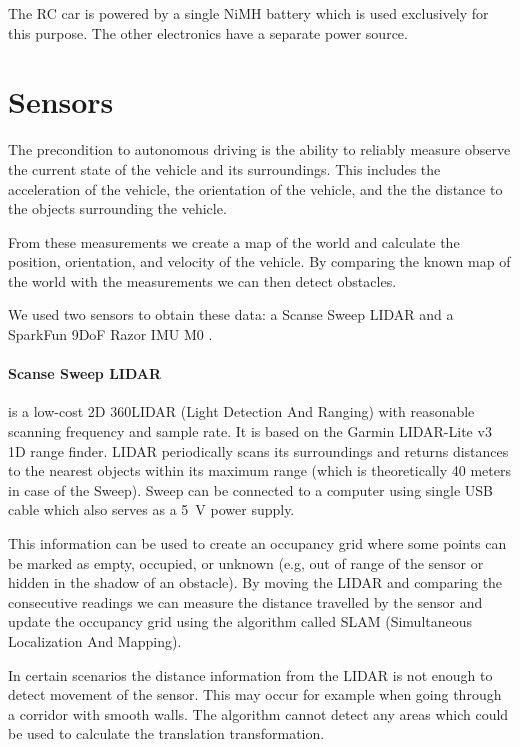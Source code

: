 The RC car is powered by a single NiMH battery which is used exclusively for this purpose. The other electronics have a separate power source.

\section{Sensors}

The precondition to autonomous driving is the ability to reliably measure observe the current state of the vehicle and its surroundings. This includes the acceleration of the vehicle, the orientation of the vehicle, and the the distance to the objects surrounding the vehicle.

From these measurements we create a map of the world and calculate the position, orientation, and velocity of the vehicle. By comparing the known map of the world with the measurements we can then detect obstacles.

We used two sensors to obtain these data: a Scanse Sweep LIDAR \cite{sweep} and a SparkFun 9DoF Razor IMU M0 \cite{imu}.

\paragraph{Scanse Sweep LIDAR} is a low-cost 2D 360\textdegree LIDAR (Light Detection And Ranging) with reasonable scanning frequency and sample rate. It is based on the Garmin LIDAR-Lite v3 \cite{lidar-lite} 1D range finder. LIDAR periodically scans its surroundings and returns distances to the nearest objects within its maximum range (which is theoretically 40 meters in case of the Sweep). Sweep can be connected to a computer using single USB cable which also serves as a \SI{5}{V} power supply.

This information can be used to create an occupancy grid where some points can be marked as empty, occupied, or unknown (e.g, out of range of the sensor or hidden in the shadow of an obstacle). By moving the LIDAR and comparing the consecutive readings we can measure the distance travelled by the sensor and update the occupancy grid using the algorithm called SLAM (Simultaneous Localization And Mapping).

In certain scenarios the distance information from the LIDAR is not enough to detect movement of the sensor. This may occur for example when going through a corridor with smooth walls. The algorithm cannot detect any areas which could be used to calculate the translation transformation.

